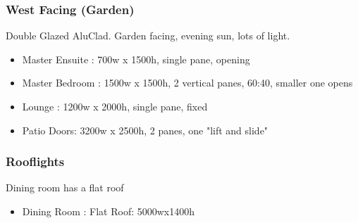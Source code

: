 \subsubsection{West Facing (Garden)}
Double Glazed AluClad. Garden facing, evening sun, lots of light.
\begin{itemize}
\item Master Ensuite : 700w x 1500h, single pane, opening
\item Master Bedroom : 1500w x 1500h, 2 vertical panes, 60:40, smaller one opens
\item Lounge : 1200w x 2000h, single pane, fixed
\item Patio Doors: 3200w x 2500h, 2 panes, one "lift and slide"
\end{itemize}

\subsubsection{Rooflights}
Dining room has a flat roof%
\begin{itemize}
\item Dining Room : Flat Roof: 5000wx1400h
\end{itemize}    
